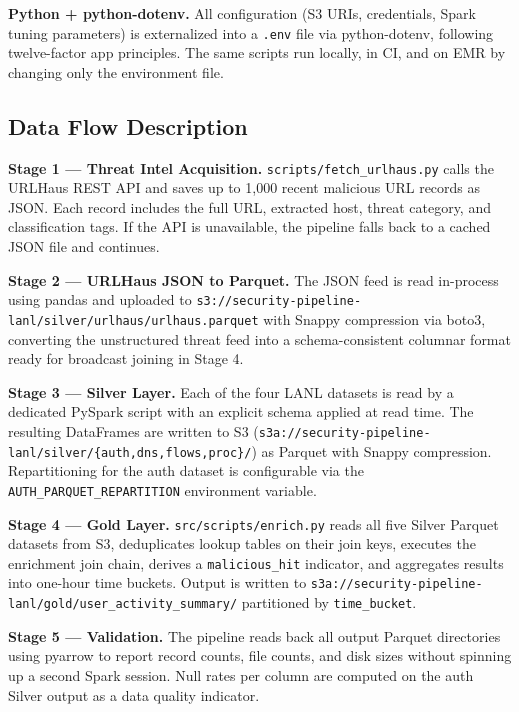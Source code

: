 \documentclass[conference]{IEEEtran}
\begin{document}
\textbf{Python + python-dotenv.} All configuration (S3 URIs, credentials, Spark tuning parameters) is externalized into a \texttt{.env} file via python-dotenv, following twelve-factor app principles. The same scripts run locally, in CI, and on EMR by changing only the environment file.

\subsection{Data Flow Description}

\textbf{Stage 1 --- Threat Intel Acquisition.} \texttt{scripts/fetch\_urlhaus.py} calls the URLHaus REST API and saves up to 1,000 recent malicious URL records as JSON. Each record includes the full URL, extracted host, threat category, and classification tags. If the API is unavailable, the pipeline falls back to a cached JSON file and continues.

\textbf{Stage 2 --- URLHaus JSON to Parquet.} The JSON feed is read in-process using pandas and uploaded to \texttt{s3://security-pipeline-lanl/silver/urlhaus/urlhaus.parquet} with Snappy compression via boto3, converting the unstructured threat feed into a schema-consistent columnar format ready for broadcast joining in Stage 4.

\textbf{Stage 3 --- Silver Layer.} Each of the four LANL datasets is read by a dedicated PySpark script with an explicit schema applied at read time. The resulting DataFrames are written to S3 (\texttt{s3a://security-pipeline-lanl/silver/\{auth,dns,flows,proc\}/}) as Parquet with Snappy compression. Repartitioning for the auth dataset is configurable via the \texttt{AUTH\_PARQUET\_REPARTITION} environment variable.

\textbf{Stage 4 --- Gold Layer.} \texttt{src/scripts/enrich.py} reads all five Silver Parquet datasets from S3, deduplicates lookup tables on their join keys, executes the enrichment join chain, derives a \texttt{malicious\_hit} indicator, and aggregates results into one-hour time buckets. Output is written to \texttt{s3a://security-pipeline-lanl/gold/user\_activity\_summary/} partitioned by \texttt{time\_bucket}.

\textbf{Stage 5 --- Validation.} The pipeline reads back all output Parquet directories using pyarrow to report record counts, file counts, and disk sizes without spinning up a second Spark session. Null rates per column are computed on the auth Silver output as a data quality indicator.

\end{document}
